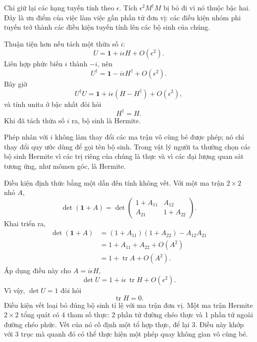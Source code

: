 Chỉ giữ lại các hạng tuyến tính theo \(\epsilon\). Tích
\(\epsilon^2M^\dagger M\) bị bỏ đi vì nó thuộc bậc hai. Đây là
ưu điểm của việc làm việc gần phần tử đơn vị: các điều kiện nhóm phi tuyến
trở thành các điều kiện tuyến tính lên các bộ sinh của chúng.

Thuận tiện hơn nếu tách một thừa số \(i\):
\begin{equation}
U=\boldsymbol 1+i\epsilon H+O(\epsilon^2).
\label{eq:l3-small-u-herm}
\end{equation}
Liên hợp phức biến \(i\) thành \(-i\), nên
\begin{equation}
U^\dagger=\boldsymbol 1-i\epsilon H^\dagger+O(\epsilon^2).
\end{equation}
Bây giờ
\begin{equation}
U^\dagger U
=\boldsymbol 1+i\epsilon(H-H^\dagger)+O(\epsilon^2),
\end{equation}
và tính unita ở bậc nhất đòi hỏi
\begin{equation}
H^\dagger=H.
\end{equation}
Khi đã tách thừa số \(i\) ra, bộ sinh là Hermite.

Phép nhân với \(i\) không làm thay đổi các ma trận vô cùng bé được phép; nó
chỉ thay đổi quy ước dùng để gọi tên bộ sinh. Trong vật lý người ta thường
chọn các bộ sinh Hermite vì các trị riêng của chúng là thực và vì các đại lượng quan sát tương ứng, như mômen góc, là Hermite.

Điều kiện định thức bằng một dẫn đến tính không vết. Với một ma trận
\(2\times2\) nhỏ \(A\),
\begin{equation}
\det(\boldsymbol 1+A)
=
\det
\begin{pmatrix}
1+A_{11}&A_{12}\\
A_{21}&1+A_{22}
\end{pmatrix}.
\end{equation}
Khai triển ra,
\begin{align}
\det(\boldsymbol 1+A)
 &=(1+A_{11})(1+A_{22})-A_{12}A_{21}\\
 &=1+A_{11}+A_{22}+O(A^2)\\
 &=1+\operatorname{tr}A+O(A^2).
\end{align}
Áp dụng điều này cho \(A=i\epsilon H\),
\begin{equation}
\det U=1+i\epsilon\,\operatorname{tr}H+O(\epsilon^2).
\end{equation}
Vì vậy, \(\det U=1\) đòi hỏi
\begin{equation}
\operatorname{tr}H=0.
\end{equation}
Điều kiện vết loại bỏ đúng bộ sinh tỉ lệ với
ma trận đơn vị. Một ma trận Hermite \(2\times2\) tổng quát có 4 tham số thực: 2
phần tử đường chéo thực và 1 phần tử ngoài đường chéo phức. Vết của nó cố định một tổ hợp thực, để lại 3. Điều này khớp với 3 trục mà quanh đó có thể thực hiện một phép quay không gian vô cùng bé.

